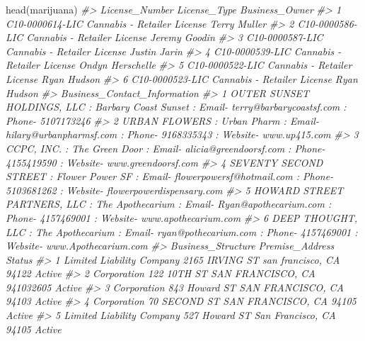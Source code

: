 \documentclass[
  12pt,
]{book}
\newenvironment{Shaded}{\begin{snugshade}}{\end{snugshade}}
\newcommand{\CommentTok}[1]{\textcolor[rgb]{0.37,0.37,0.37}{\textit{#1}}}
\newcommand{\FunctionTok}[1]{\textcolor[rgb]{0,0,0}{#1}}
\newcommand{\NormalTok}[1]{#1}
\begin{document}
\begin{Shaded}
\begin{Highlighting}[]
\FunctionTok{head}\NormalTok{(marijuana)}
\CommentTok{\#\textgreater{}    License\_Number                License\_Type   Business\_Owner}
\CommentTok{\#\textgreater{} 1 C10{-}0000614{-}LIC Cannabis {-} Retailer License     Terry Muller}
\CommentTok{\#\textgreater{} 2 C10{-}0000586{-}LIC Cannabis {-} Retailer License    Jeremy Goodin}
\CommentTok{\#\textgreater{} 3 C10{-}0000587{-}LIC Cannabis {-} Retailer License     Justin Jarin}
\CommentTok{\#\textgreater{} 4 C10{-}0000539{-}LIC Cannabis {-} Retailer License Ondyn Herschelle}
\CommentTok{\#\textgreater{} 5 C10{-}0000522{-}LIC Cannabis {-} Retailer License      Ryan Hudson}
\CommentTok{\#\textgreater{} 6 C10{-}0000523{-}LIC Cannabis {-} Retailer License      Ryan Hudson}
\CommentTok{\#\textgreater{}                                                                                                           Business\_Contact\_Information}
\CommentTok{\#\textgreater{} 1                             OUTER SUNSET HOLDINGS, LLC  : Barbary Coast Sunset : Email{-} terry@barbarycoastsf.com : Phone{-} 5107173246}
\CommentTok{\#\textgreater{} 2                           URBAN FLOWERS  : Urban Pharm : Email{-} hilary@urbanpharmsf.com : Phone{-} 9168335343 : Website{-} www.up415.com}
\CommentTok{\#\textgreater{} 3                      CCPC, INC.  : The Green Door : Email{-} alicia@greendoorsf.com : Phone{-} 4155419590 : Website{-} www.greendoorsf.com}
\CommentTok{\#\textgreater{} 4 SEVENTY SECOND STREET  : Flower Power SF : Email{-} flowerpowersf@hotmail.com : Phone{-} 5103681262 : Website{-} flowerpowerdispensary.com}
\CommentTok{\#\textgreater{} 5   HOWARD STREET PARTNERS, LLC  : The Apothecarium : Email{-} Ryan@apothecarium.com : Phone{-} 4157469001 : Website{-} www.apothecarium.com}
\CommentTok{\#\textgreater{} 6              DEEP THOUGHT, LLC  : The Apothecarium : Email{-} ryan@pothecarium.com : Phone{-} 4157469001 : Website{-} www.Apothecarium.com}
\CommentTok{\#\textgreater{}          Business\_Structure                         Premise\_Address Status}
\CommentTok{\#\textgreater{} 1 Limited Liability Company  2165 IRVING ST san francisco, CA 94122 Active}
\CommentTok{\#\textgreater{} 2               Corporation 122 10TH ST SAN FRANCISCO, CA 941032605 Active}
\CommentTok{\#\textgreater{} 3               Corporation   843 Howard ST SAN FRANCISCO, CA 94103 Active}
\CommentTok{\#\textgreater{} 4               Corporation    70 SECOND ST SAN FRANCISCO, CA 94105 Active}
\CommentTok{\#\textgreater{} 5 Limited Liability Company   527 Howard ST San Francisco, CA 94105 Active}

\end{Highlighting}
\end{Shaded}
\end{document}
